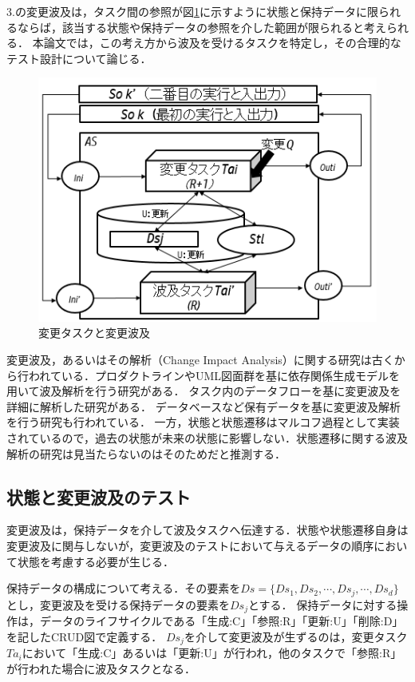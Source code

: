 \documentclass[a4paper,12pt]{jreport}
\begin{document}
3.の変更波及は，タスク間の参照が図\ref{fig:fig-2}に示すように状態と保持データに限られるならば，該当する状態や保持データの参照を介した範囲が限られると考えられる．
本論文では，この考え方から波及を受けるタスクを特定し，その合理的なテスト設計について論じる．



\begin{figure}[b]
\begin{center}
\includegraphics[scale=0.5]{./image/fig-2.png}
\end{center}
\caption{変更タスクと変更波及}
\label{fig:fig-2}
\end{figure}

変更波及，あるいはその解析（Change Impact Analysis）に関する研究は古くから行われている．プロダクトラインやUML図面群を基に依存関係生成モデルを用いて波及解析を行う研究がある\cite{gomaa2005designing,briand2003impact,小谷正行2008}．
タスク内のデータフローを基に変更波及を詳細に解析した研究がある\cite{campbell1990}．
データベースなど保有データを基に変更波及解析を行う研究も行われている\cite{maule2008impact,加藤正恭2011}．
一方，状態と状態遷移はマルコフ過程として実装されているので，過去の状態が未来の状態に影響しない．状態遷移に関する波及解析の研究は見当たらないのはそのためだと推測する．%
\cite{LSOF}
\cite{kang1990feature}
\subsection{状態と変更波及のテスト}
変更波及は，保持データを介して波及タスクへ伝達する．状態や状態遷移自身は変更波及に関与しないが，変更波及のテストにおいて与えるデータの順序において状態を考慮する必要が生じる．

保持データの構成について考える．その要素を$Ds=\{Ds_1,Ds_2,\cdots,Ds_j,\cdots,Ds_d\}$とし，変更波及を受ける保持データの要素を$Ds_j$とする．
保持データに対する操作は，データのライフサイクルである「生成:C」「参照:R」「更新:U」「削除:D」を記したCRUD図で定義する．
$Ds_j$を介して変更波及が生ずるのは，変更タスク$Ta_i$において「生成:C」あるいは「更新:U」が行われ，他のタスクで「参照:R」が行われた場合に波及タスクとなる．
\end{document}
